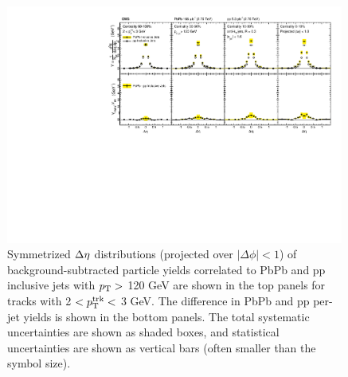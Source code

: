 \begin{figure}[hbt] 
\begin{center} 
\includegraphics[width=0.99\textwidth]{figures/Results/PAS_Figure_3_TrkPt2_TrkPt3.pdf}
\caption[Inclusive jet $\Delta\eta$ correlations for tracks with $2 < p_{\rm T}^{\rm trk} < 3$ GeV at 2.76 TeV]{Symmetrized $\protect\Delta\eta$ distributions (projected over $|\Delta\phi| < 1$) of background-subtracted particle yields correlated to PbPb and pp inclusive jets with $p_{\rm T}>$ 120 GeV are shown in the top panels for tracks with 2 $ < p_{\rm T}^{\rm trk} < $ 3 GeV.  The difference in PbPb and pp per-jet yields is shown in the bottom panels. The total systematic uncertainties are shown as shaded boxes, and statistical uncertainties are shown as vertical bars (often smaller than the symbol size).}
\label{fig:Inclusive_dEta2}
\end{center} 
\end{figure} 

